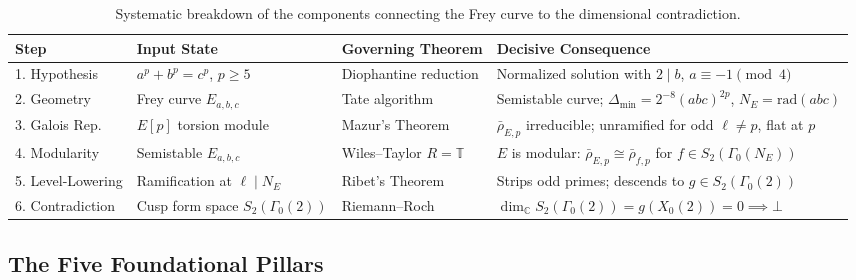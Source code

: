 \documentclass[11pt,a4paper]{article}
\theoremstyle{plain}
\theoremstyle{definition}
\theoremstyle{remark}
\newcommand{\C}{\mathbb{C}}
\begin{document}
\begin{table}[H]
\centering
\small
\begin{tabularx}{\textwidth}{l p{3.2cm} p{3.8cm} X}
\toprule
\textbf{Step} & \textbf{Input State} & \textbf{Governing Theorem} & \textbf{Decisive Consequence} \\
\midrule
1. Hypothesis & $a^p + b^p = c^p$, $p \ge 5$ & Diophantine reduction & Normalized solution with $2 \mid b$, $a \equiv -1 \pmod 4$ \\
2. Geometry & Frey curve $E_{a,b,c}$ & Tate algorithm~\cite{silverman2009} & Semistable curve; $\Delta_{\min} = 2^{-8}(abc)^{2p}$, $N_E = \mathrm{rad}(abc)$ \\
3. Galois Rep. & $E[p]$ torsion module & Mazur's Theorem~\cite{mazur1977} & $\bar{\rho}_{E,p}$ irreducible; unramified for odd $\ell \neq p$, flat at $p$ \\
4. Modularity & Semistable $E_{a,b,c}$ & Wiles--Taylor $R = \mathbb{T}$~\cite{wiles1995, taylorwiles1995} & $E$ is modular: $\bar{\rho}_{E,p} \cong \bar{\rho}_{f,p}$ for $f \in S_2(\Gamma_0(N_E))$ \\
5. Level-Lowering & Ramification at $\ell \mid N_E$ & Ribet's Theorem~\cite{ribet1990, serre1987} & Strips odd primes; descends to $g \in S_2(\Gamma_0(2))$ \\
6. Contradiction & Cusp form space $S_2(\Gamma_0(2))$ & Riemann--Roch~\cite{diamondshurman2005} & $\dim_\C S_2(\Gamma_0(2)) = g(X_0(2)) = 0 \implies \boldsymbol{\bot}$ \\
\bottomrule
\end{tabularx}
\caption{Systematic breakdown of the components connecting the Frey curve to the dimensional contradiction.}
\label{tab:logical-chain}
\end{table}

\subsection{The Five Foundational Pillars}
\end{document}
